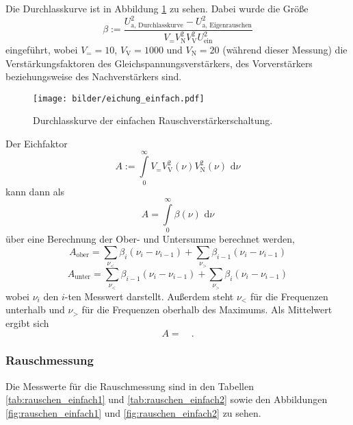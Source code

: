 		Die Durchlasskurve ist in Abbildung \ref{fig:eichung_einfach} zu sehen. Dabei wurde die Größe
		\begin{equation}
		\beta := \frac{U^2_\text{a, Durchlasskurve}-U_\text{a, Eigenrauschen}^2}
		{V_= V_\text{N}^2 V_\text{V}^2  U^2_\text{ein}}
		\end{equation}
		eingeführt, wobei $V_= =10$, $V_\text{V}=1000$ und $V_\text{N}=20$ (während dieser Messung)
		die Verstärkungsfaktoren des Gleichspannungsverstärkers, des Vorverstärkers beziehungsweise
		des Nachverstärkers sind.

		\begin{figure}
			\centering
			\texttt{[image: bilder/eichung\_einfach.pdf]}
			\caption{Durchlasskurve der einfachen Rauschverstärkerschaltung.}
			\label{fig:eichung_einfach}
		\end{figure}

		Der Eichfaktor
		\begin{equation}
			A:=\int\limits_0^\infty V_= V_\text{V}^2(\nu) V_\text{N}^2(\nu) \text{ d}\nu
		\end{equation}
		kann dann als
		\begin{equation}
			A = \int \limits_0^\infty \beta(\nu) \text{ d}\nu
		\end{equation}
		über eine Berechnung der Ober- und Untersumme berechnet werden,
		\begin{equation}
			A_\text{ober} = \sum\limits_{\nu_<} \beta_i (\nu_i-\nu_{i-1}) +
			\sum\limits_{\nu_>} \beta_{i-1} (\nu_i-\nu_{i-1})
		\end{equation}
		\begin{equation}
			A_\text{unter} = \sum\limits_{\nu_<} \beta_{i-1} (\nu_i-\nu_{i-1}) +
			\sum\limits_{\nu_>} \beta_{i} (\nu_i-\nu_{i-1})
		\end{equation}
		wobei $\nu_i$ den $i$-ten Messwert darstellt. Außerdem
		steht $\nu_<$ für die Frequenzen unterhalb und $\nu_>$ für die
		Frequenzen oberhalb des Maximums. Als Mittelwert ergibt sich
		\begin{equation}
			A =     \quad .
		\end{equation}



	\subsubsection{Rauschmessung}
		Die Messwerte für die Rauschmessung sind in den Tabellen \ref{tab:rauschen_einfach1}
		und \ref{tab:rauschen_einfach2} sowie den Abbildungen
		\ref{fig:rauschen_einfach1} und \ref{fig:rauschen_einfach2} zu sehen.


